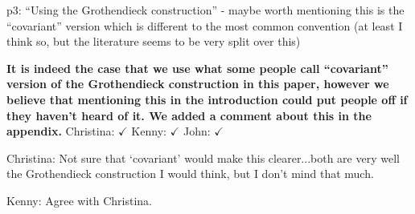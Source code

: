 \documentclass[reqno]{amsart}
\def\chris{\color{purple} Christina: }
\def\john{\color{red} John: }
\def\kenny{\color{blue} Kenny: }
\begin{document}
\begin{enumerate}
{%







\item p3: “Using the Grothendieck construction” - maybe worth mentioning this is the “covariant” version which is different to the most common 
convention 
(at least I think so, but the literature seems to be very split over this)

{\bf It is indeed the case that we use what some people call ``covariant'' version of the Grothen\-dieck construction in this paper, however we 
believe 
that mentioning this in the introduction could put people off if they haven't heard of it. We added a comment about this in the 
appendix.} {\chris $\checkmark$} {\kenny $\checkmark$} {\john $\checkmark$}

\iffalse
{\chris Not sure that `covariant' would make this clearer...both are very well the Grothendieck construction I would think, but I don't mind that 
much.}

{\kenny Agree with Christina.}

}
\end{enumerate}
\end{document}
